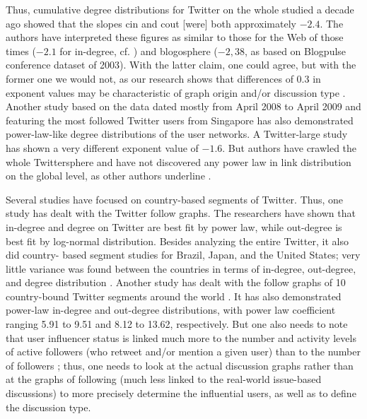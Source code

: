 Thus, cumulative degree distributions \cite{Newman} for Twitter on the whole studied a decade ago \cite{JavaSongFinin} showed that the slopes cin and cout [were] both approximately \(-2.4\). The authors have interpreted these figures as similar to those for the Web of those times (\(-2.1\) for in-degree, cf. \cite{DonatoLauraLeonardi}) and blogosphere (\(-2,38\), as based on Blogpulse conference dataset of 2003). With the latter claim, one could agree, but with the former one we would not, as our research shows that differences of 0.3 in exponent values may be characteristic of graph origin and/or discussion type \cite{BlekanovSergeevMaksimov2017}. Another study \cite{WengLimJiang} based on the data dated mostly from April 2008 to April 2009 and featuring the most followed Twitter users from Singapore has also demonstrated power-law-like degree distributions of the user networks. A Twitter-large study \cite{WelchSchonfeldHe} has shown a very different exponent value of \(-1.6\). But authors \cite{KwakLeePark} have crawled the whole Twittersphere and have not discovered any power law in link distribution on the global level, as other authors underline \cite{HansenArvidssonNielsen}.

Several studies have focused on country-based segments of Twitter. Thus, one study \cite{MyersSharmaGupta} has dealt with the Twitter follow graphs. The researchers have shown that in-degree and degree on Twitter are best fit by power law, while out-degree is best fit by log-normal distribution. Besides analyzing the entire Twitter, it also did country- based segment studies for Brazil, Japan, and the United States; very little variance was found between the countries in terms of in-degree, out-degree, and degree distribution \cite[p.~494]{MyersSharmaGupta}. Another study has dealt with the follow graphs of 10 country-bound Twitter segments around the world \cite{PobleteGarciaMendoza}. It has also demonstrated power-law in-degree and out-degree distributions, with power law coefficient ranging 5.91 to 9.51 and 8.12 to 13.62, respectively. But one also needs to note that user influencer status is linked much more to the number and activity levels of active followers (who retweet and/or mention a given user) than to the number of followers \cite{ChaHaddadiBenevenuto}; thus, one needs to look at the actual discussion graphs rather than at the graphs of following (much less linked to the real-world issue-based discussions) to more precisely determine the influential users, as well as to define the discussion type.

